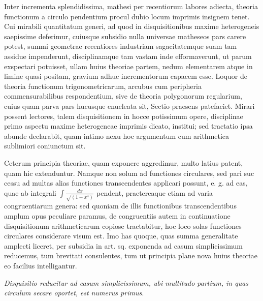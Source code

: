 Inter incrementa splendidissima, mathesi per recentiorum labores adiecta, theoria functionum a circulo pendentium procul dubio locum imprimis insignem tenet. Cui mirabili quantitatum generi, ad quod in disquisitionibus maxime heterogeneis saepissime deferimur, cuiusque subsidio nulla universae matheseos pars carere potest, summi geometrae recentiores industriam sagacitatemque suam tam assidue impenderunt, disciplinamque tam vastam inde efformaverunt, ut parum exspectari potuisset, ullam huius theoriae partem, nedum elementarem atque in limine quasi positam, gravium adhuc incrementorum capacem esse. Loquor de theoria functionum trigonometricarum, arcubus cum peripheria commensurabilibus respondentium, sive de theoria polygonorum regularium, cuius quam parva pars hucusque enucleata sit, Sectio praesens patefaciet. Mirari possent lectores, talem disquisitionem in hocce potissimum opere, disciplinae primo aspectu maxime heterogeneae imprimis dicato, institui; sed tractatio ipsa abunde declarabit, quam intimo nexu hoc argumentum cum arithmetica sublimiori coniunctum sit.

Ceterum principia theoriae, quam exponere aggredimur, multo latius patent, quam hic extenduntur. Namque non solum ad functiones circulares, sed pari suc%
cessu ad multas alias functiones transcendentes applicari possunt, e. g. ad eas, quae ab integrali \(\int\frac{dx}{\surd{(1-x^4)}}\) pendent, praetereaque etiam ad varia congruentiarum genera: sed quoniam de illis functionibus transcendentibus amplum opus peculiare paramus, de congruentiis autem in continuatione disquisitionum arithmeticarum copiose tractabitur, hoc loco solas functiones circulares considerare visum est. Imo has quoque, quas summa generalitate amplecti liceret, per subsidia in art. sq. exponenda ad casum simplicissimum reducemus, tum brevitati consulentes, tum ut principia plane nova huius theoriae eo facilius intelligantur.

\begin{center}\textit{Disquisitio reducitur ad casum simplicissimum, ubi multitudo partium, in quas circulum secare oportet,} \textit{est numerus primus.}\end{center}


